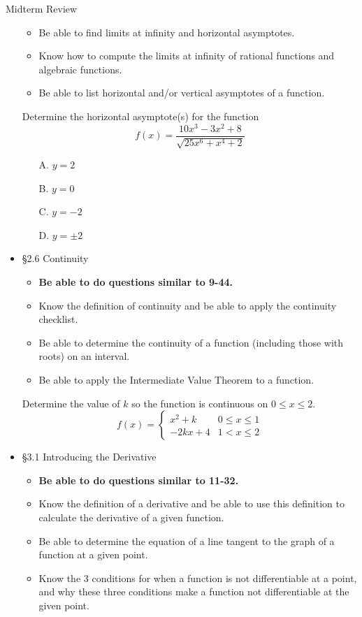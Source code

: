 \documentclass[cal1spr16Lectures.tex]{subfiles}
\begin{document}
\begin{frame}[allowframebreaks]{Midterm Review}
\begin{itemize}
\begin{itemize}
	\item Be able to find limits at infinity and horizontal asymptotes. 
	\item Know how to compute the limits at infinity of rational functions and algebraic functions.
	\item Be able to list horizontal and/or vertical asymptotes of a function.
	\end{itemize}
\begin{exe}
Determine the horizontal asymptote(s) for the function
\[
f(x)=\frac{10x^3-3x^2+8}{\sqrt{25x^6+x^4+2}}
\]
\begin{itemize}
\item[A. ] $y=2$
\item[B. ] $y=0$
\item[C. ] $y=-2$
\item[D. ] $y=\pm 2$
\end{itemize}
\end{exe}	

\framebreak	
\item \S 2.6 Continuity
	\begin{itemize}\footnotesize
	\item {\bf Be able to do questions similar to 9-44.}
	\item Know the definition of continuity and be able to apply the continuity checklist.
	\item Be able to determine the continuity of a function (including those with roots) on an interval.
	\item Be able to apply the Intermediate Value Theorem to a function.
	\end{itemize}
\framebreak
\begin{exe}
Determine the value of $k$ so the function is continuous on $0\leq x\leq 2$.
\[f(x)=\begin{cases}x^2+k & 0\leq x\leq 1 \\
	-2kx+4 & 1<x\leq 2\end{cases}
	\]
\end{exe}	

\framebreak
\item \S 3.1 Introducing the Derivative
	\begin{itemize}\footnotesize
	\item {\bf Be able to do questions similar to 11-32.}
	\item Know the definition of a derivative and be able to use this definition to calculate the derivative of a given function.
	\item Be able to determine the equation of a line tangent to the graph of a function at a given point.
	\item Know the 3 conditions for when a function is not differentiable at a point, and why these three conditions make a function not differentiable at the given point.
	\end{itemize}


\end{itemize}
\end{frame}
\end{document}
